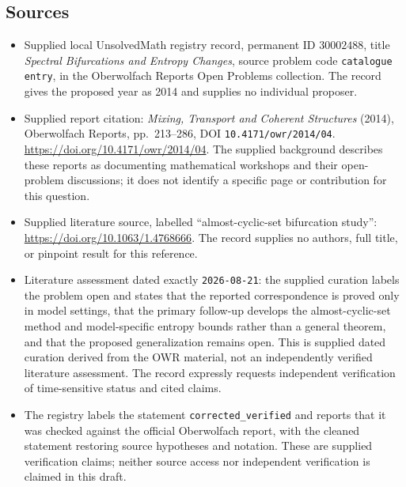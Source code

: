 \documentclass[11pt]{article}
\begin{document}
\subsection{Sources}
\begin{itemize}
\item Supplied local UnsolvedMath registry record, permanent ID \(30002488\), title \emph{Spectral Bifurcations and Entropy Changes}, source problem code \texttt{catalogue entry}, in the Oberwolfach Reports Open Problems collection. The record gives the proposed year as 2014 and supplies no individual proposer.
\item Supplied report citation: \emph{Mixing, Transport and Coherent Structures} (2014), Oberwolfach Reports, pp.~213--286, DOI \texttt{10.4171/owr/2014/04}. \url{https://doi.org/10.4171/owr/2014/04}. The supplied background describes these reports as documenting mathematical workshops and their open-problem discussions; it does not identify a specific page or contribution for this question.
\item Supplied literature source, labelled ``almost-cyclic-set bifurcation study'': \url{https://doi.org/10.1063/1.4768666}. The record supplies no authors, full title, or pinpoint result for this reference.
\item Literature assessment dated exactly \texttt{2026-08-21}: the supplied curation labels the problem open and states that the reported correspondence is proved only in model settings, that the primary follow-up develops the almost-cyclic-set method and model-specific entropy bounds rather than a general theorem, and that the proposed generalization remains open. This is supplied dated curation derived from the OWR material, not an independently verified literature assessment. The record expressly requests independent verification of time-sensitive status and cited claims.
\item The registry labels the statement \texttt{corrected\_verified} and reports that it was checked against the official Oberwolfach report, with the cleaned statement restoring source hypotheses and notation. These are supplied verification claims; neither source access nor independent verification is claimed in this draft.
\end{itemize}
\end{document}
